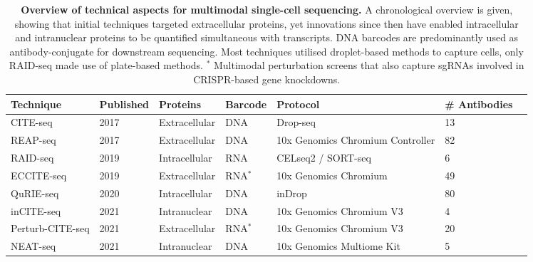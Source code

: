 \documentclass[times, twoside, watermark]{zHenriquesLab-StyleBioRxiv}
\begin{document}
\begin{table}[h]
\centering
\begin{tabular}{l|l|l|l|l|l l}
\textbf{Technique} & \textbf{Published} & \textbf{Proteins} & \textbf{Barcode} & \textbf{Protocol} & \textbf{\# Antibodies}  \\
\hline
CITE-seq \cite{Stoeckius2017} & 2017 & Extracellular & DNA & Drop-seq \cite{Macosko2015} & 13 \\
REAP-seq \cite{Peterson2017} & 2017 & Extracellular & DNA & 10x Genomics Chromium Controller \cite{Villani2017} & 82 \\
RAID-seq \cite{Gerlach2019} & 2019 & Intracellular & RNA & CELseq2 / SORT-seq \cite{Muraro2016,Hashimshony2016} & 6 \\
ECCITE-seq \cite{Mimitou2019} & 2019 & Extracellular & RNA$^*$ & 10x Genomics Chromium & 49 \\
QuRIE-seq \cite{Rivello2020} & 2020 & Intracellular & DNA & inDrop \cite{Klein2015} & 80 \\
inCITE-seq \cite{Chung2021} & 2021 & Intranuclear & DNA & 10x Genomics Chromium V3 & 4 \\
Perturb-CITE-seq \cite{Frangieh2021} & 2021 & Extracellular & RNA$^*$ & 10x Genomics Chromium V3 & 20 \\
NEAT-seq \cite{Chen2021} & 2021 & Intranuclear & DNA & 10x Genomics Multiome Kit & 5 \\
\end{tabular}
\caption{\textbf{Overview of technical aspects for multimodal single-cell sequencing.} A chronological overview is given, showing that initial techniques targeted extracellular proteins, yet innovations since then have enabled intracellular and intranuclear proteins to be quantified simultaneous with transcripts. DNA barcodes are predominantly used as antibody-conjugate for downstream sequencing. Most techniques utilised droplet-based methods to capture cells, only RAID-seq made use of plate-based methods. \newline $^*$ Multimodal perturbation screens that also capture sgRNAs involved in CRISPR-based gene knockdowns.}
\label{table:Table 1}    
\end{table}
\end{document}

